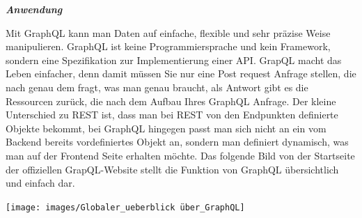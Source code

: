 \textit{\textbf{Anwendung}}

Mit GraphQL kann man Daten auf einfache, flexible und sehr präzise Weise manipulieren. GraphQL ist keine Programmiersprache und kein Framework, sondern eine Spezifikation zur Implementierung einer API.
GrapQL macht das Leben einfacher, denn damit müssen Sie nur eine Post request Anfrage stellen, die nach genau dem fragt, was man genau braucht, als Antwort gibt es die Ressourcen zurück, die nach dem Aufbau Ihres GraphQL Anfrage. Der kleine Unterschied zu REST ist, dass man bei REST von den Endpunkten definierte Objekte bekommt, bei GraphQL hingegen passt man sich nicht an ein vom Backend bereits vordefiniertes Objekt an, sondern man definiert dynamisch, was man auf der Frontend Seite erhalten möchte. 
Das folgende Bild von der Startseite der offiziellen GrapQL-Website stellt die Funktion von GraphQL übersichtlich und einfach dar.

\begin{center}
\texttt{[image: images/Globaler\_ueberblick über\_GraphQL]}
\end{center}



